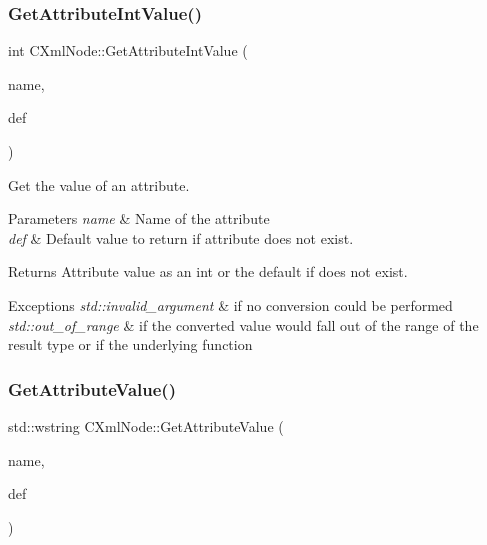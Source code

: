 \subsubsection{\texorpdfstring{Get\+Attribute\+Int\+Value()}{GetAttributeIntValue()}}
{\footnotesize\ttfamily int C\+Xml\+Node\+::\+Get\+Attribute\+Int\+Value (\begin{DoxyParamCaption}\item[{const std\+::wstring \&}]{name,  }\item[{int}]{def }\end{DoxyParamCaption})}



Get the value of an attribute. 


\begin{DoxyParams}{Parameters}
{\em name} & Name of the attribute \\
\hline
{\em def} & Default value to return if attribute does not exist. \\
\hline
\end{DoxyParams}
\begin{DoxyReturn}{Returns}
Attribute value as an int or the default if does not exist. 
\end{DoxyReturn}

\begin{DoxyExceptions}{Exceptions}
{\em std\+::invalid\+\_\+argument} & if no conversion could be performed \\
\hline
{\em std\+::out\+\_\+of\+\_\+range} & if the converted value would fall out of the range of the result type or if the underlying function \\
\hline
\end{DoxyExceptions}
\mbox{\label{classxmlnode_1_1_c_xml_node_ac4b635b102a0ba6c0f64d047fd27f2a1}} 
\subsubsection{\texorpdfstring{Get\+Attribute\+Value()}{GetAttributeValue()}}
{\footnotesize\ttfamily std\+::wstring C\+Xml\+Node\+::\+Get\+Attribute\+Value (\begin{DoxyParamCaption}\item[{const std\+::wstring \&}]{name,  }\item[{const std\+::wstring \&}]{def }\end{DoxyParamCaption})}



